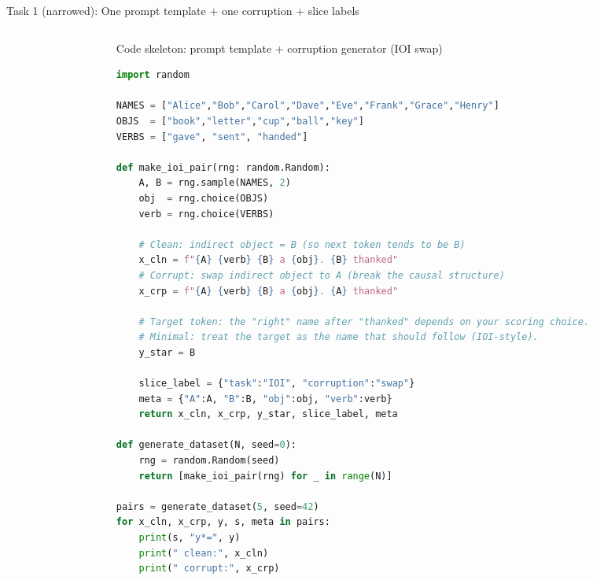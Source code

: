 \documentclass[aspectratio=169,xcolor={dvipsnames}]{beamer}
\begin{document}
\begin{frame}[fragile,shrink=45]{Task 1 (narrowed): One prompt template + one corruption + slice labels}
\begin{columns}[T,onlytextwidth]
\begin{column}{0.5\textwidth}
\end{column}

\begin{column}{0.48\textwidth}
\begin{block}{Code skeleton: prompt template + corruption generator (IOI swap)}
\footnotesize
\begin{lstlisting}[language=Python,basicstyle=\ttfamily\scriptsize]
import random

NAMES = ["Alice","Bob","Carol","Dave","Eve","Frank","Grace","Henry"]
OBJS  = ["book","letter","cup","ball","key"]
VERBS = ["gave", "sent", "handed"]

def make_ioi_pair(rng: random.Random):
    A, B = rng.sample(NAMES, 2)
    obj  = rng.choice(OBJS)
    verb = rng.choice(VERBS)

    # Clean: indirect object = B (so next token tends to be B)
    x_cln = f"{A} {verb} {B} a {obj}. {B} thanked"
    # Corrupt: swap indirect object to A (break the causal structure)
    x_crp = f"{A} {verb} {B} a {obj}. {A} thanked"

    # Target token: the "right" name after "thanked" depends on your scoring choice.
    # Minimal: treat the target as the name that should follow (IOI-style).
    y_star = B

    slice_label = {"task":"IOI", "corruption":"swap"}
    meta = {"A":A, "B":B, "obj":obj, "verb":verb}
    return x_cln, x_crp, y_star, slice_label, meta

def generate_dataset(N, seed=0):
    rng = random.Random(seed)
    return [make_ioi_pair(rng) for _ in range(N)]

pairs = generate_dataset(5, seed=42)
for x_cln, x_crp, y, s, meta in pairs:
    print(s, "y*=", y)
    print(" clean:", x_cln)
    print(" corrupt:", x_crp)
\end{lstlisting}
\end{block}

\vspace{1mm}

\end{column}
\end{columns}
\end{frame}
\end{document}
